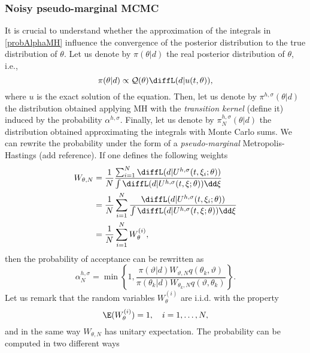 

\subsubsection{Noisy pseudo-marginal MCMC} \label{sect:MCWM}

It is crucial to understand whether the approximation of the integrals in \eqref{probAlphaMH} influence the convergence of the posterior distribution to the true distribution of $\theta$. Let us denote by $\pi(\theta|d)$ the real posterior distribution of $\theta$, i.e.,
\begin{equation}
	\pi(\theta|d) \propto \mathcal{Q}(\theta) \diffL(d|u(t,\theta)),
\end{equation}
where $u$ is the exact solution of the equation. Then, let us denote by $\pi^{h,\sigma}(\theta|d)$ the distribution obtained applying MH with the \textit{transition kernel} (define it) induced by the probability $\alpha^{h,\sigma}$. Finally, let us denote by $\pi^{h,\sigma}_N(\theta|d)$ the distribution obtained approximating the integrals with Monte Carlo sums. We can rewrite the probability under the form of a \textit{pseudo-marginal} Metropolis-Hastings (add reference). If one defines the following weights 
\begin{equation}
\begin{aligned}
	W_{\theta, N} &= \frac{1}{N} \frac{\sum_{i=1}^{N}\diffL(d|U^{h,\sigma}(t,\xi_i; \theta))}{\int{\diffL(d|U^{h,\sigma}(t,\xi; \theta))\dd\xi}} \\
			      &= \frac{1}{N} \sum_{i=1}^{N}\frac{\diffL(d|U^{h,\sigma}(t,\xi_i; \theta))}{\int{\diffL(d|U^{h,\sigma}(t,\xi; \theta))\dd\xi}} \\
			      &= \frac{1}{N} \sum_{i=1}^{N}W_\theta^{(i)},
\end{aligned}
\end{equation}
then the probability of acceptance can be rewritten as
\begin{equation}
	\alpha^{h,\sigma}_{N} = \min\left\{1, \frac{\pi(\vartheta|d)W_{\vartheta,N}q(\theta_k, \vartheta)}{\pi(\theta_k|d)W_{\theta_k,N}q(\vartheta,\theta_k)}\right\}.
\end{equation}
Let us remark that the random variables $W_\theta^{(i)}$ are i.i.d. with the property
\begin{equation}
	\E(W_\theta^{(i)}) = 1, \quad i = 1, \ldots, N,
\end{equation}
and in the same way $W_{\theta,N}$ has unitary expectation. The probability can be computed in two different ways
